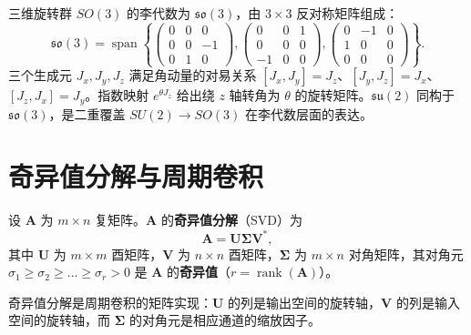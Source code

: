 \begin{example}\label{ex:su2_rotation}
三维旋转群 $SO(3)$ 的李代数为 $\mathfrak{so}(3)$，由 $3 \times 3$ 反对称矩阵组成：
\[
\mathfrak{so}(3) = \operatorname{span}\left\{
\begin{pmatrix} 0 & 0 & 0 \\ 0 & 0 & -1 \\ 0 & 1 & 0 \end{pmatrix},
\begin{pmatrix} 0 & 0 & 1 \\ 0 & 0 & 0 \\ -1 & 0 & 0 \end{pmatrix},
\begin{pmatrix} 0 & -1 & 0 \\ 1 & 0 & 0 \\ 0 & 0 & 0 \end{pmatrix}
\right\}.
\]
三个生成元 $J_x, J_y, J_z$ 满足角动量的对易关系 $[J_x, J_y] = J_z$、$[J_y, J_z] = J_x$、$[J_z, J_x] = J_y$。指数映射 $e^{\theta J_z}$ 给出绕 $z$ 轴转角为 $\theta$ 的旋转矩阵。$\mathfrak{su}(2)$ 同构于 $\mathfrak{so}(3)$，是二重覆盖 $SU(2) \to SO(3)$ 在李代数层面的表达。
\end{example}

\section{\texorpdfstring{奇异值分解与周期卷积}{奇异值分解与周期卷积}}

\begin{definition}[奇异值分解]\label{def:svd}
设 $\mathbf{A}$ 为 $m \times n$ 复矩阵。$\mathbf{A}$ 的\textbf{奇异值分解}（SVD）为
\[
\mathbf{A} = \mathbf{U} \boldsymbol{\Sigma} \mathbf{V}^*,
\]
其中 $\mathbf{U}$ 为 $m \times m$ 酉矩阵，$\mathbf{V}$ 为 $n \times n$ 酉矩阵，$\boldsymbol{\Sigma}$ 为 $m \times n$ 对角矩阵，其对角元 $\sigma_1 \ge \sigma_2 \ge \dots \ge \sigma_r > 0$ 是 $\mathbf{A}$ 的\textbf{奇异值}（$r = \operatorname{rank}(\mathbf{A})$）。

奇异值分解是周期卷积的矩阵实现：$\mathbf{U}$ 的列是输出空间的旋转轴，$\mathbf{V}$ 的列是输入空间的旋转轴，而 $\boldsymbol{\Sigma}$ 的对角元是相应通道的缩放因子。
\end{definition}

